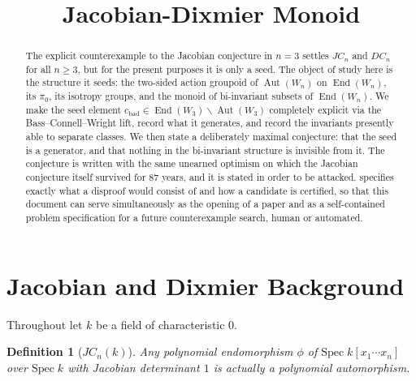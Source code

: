 \documentclass[11pt]{article}
\title{Jacobian-Dixmier Monoid}
\theoremstyle{change}
\newtheorem{definition}[equation]{Definition}
\theoremstyle{nonumberplain}
\numberwithin{equation}{section}
\newcommand\sminus{\smallsetminus}
\DeclareMathOperator{\End}{End}
\DeclareMathOperator{\Aut}{Aut}
\begin{document}
\maketitle

\begin{abstract}

The explicit counterexample to the Jacobian conjecture in $n=3$ \cite{Alpoge,Speyer,Tao} settles $JC_n$ and $DC_n$ for all $n \geq 3$, but for the present purposes it is only a seed. The object of study here is the structure it seeds: the two-sided action groupoid of $\Aut(W_n)$ on $\End(W_n)$, its $\pi_0$, its isotropy groups, and the monoid of bi-invariant subsets of $\End(W_n)$. We make the seed element $c_{\text{bad}} \in \End(W_3) \sminus \Aut(W_3)$ completely explicit via the Bass--Connell--Wright lift, record what it generates, and record the invariants presently able to separate classes. We then state a deliberately maximal conjecture: that the seed is a generator, and that nothing in the bi-invariant structure is invisible from it. The conjecture is written with the same unearned optimism on which the Jacobian conjecture itself survived for 87 years, and it is stated in order to be attacked.  specifies exactly what a disproof would consist of and how a candidate is certified, so that this document can serve simultaneously as the opening of a paper and as a self-contained problem specification for a future counterexample search, human or automated.

\end{abstract}

\section{Jacobian and Dixmier Background}

Throughout let $k$ be a field of characteristic $0$.

\begin{definition}[$JC_n (k)$]
Any polynomial endomorphism $\phi$ of $\text{Spec} \; k[x_1 \cdots x_n]$ over $\text{Spec} \; k$ with Jacobian determinant $1$ is actually a polynomial automorphism.
\end{definition}
\end{document}
